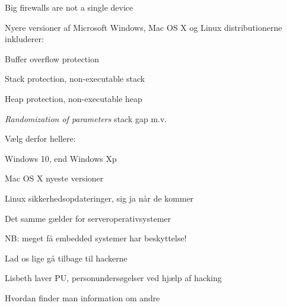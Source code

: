 \documentclass[Screen16to9,17pt]{foils}
\begin{document}


\centerline{Big firewalls are not a single device}






\begin{list1}
\item Nyere versioner af Microsoft Windows, Mac OS X og Linux distributionerne inkluderer:
\begin{list2}
\item Buffer overflow protection
\item Stack protection, non-executable stack
\item Heap protection, non-executable heap
\item \emph{Randomization of parameters} stack gap m.v.
\end{list2}
\item Vælg derfor hellere:
\begin{list2}
\item Windows 10, end Windows Xp
\item Mac OS X nyeste versioner
\item Linux sikkerhedsopdateringer, sig ja når de kommer
\end{list2}
\item Det samme gælder for serveroperativsystemer
\item NB: meget få embedded systemer har beskyttelse!
\end{list1}






\centerline{Lad os lige gå tilbage til hackerne}


\begin{list1}
\item Lisbeth laver PU, personundersøgelser ved hjælp af hacking
\item Hvordan finder man information om andre
\end{list1}
\end{document}
